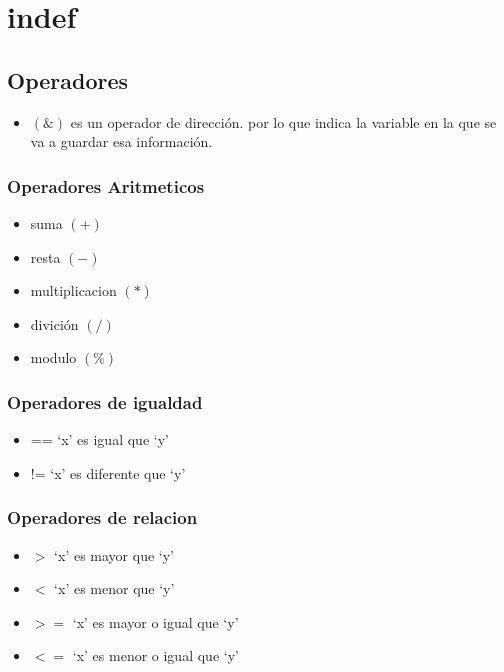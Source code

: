 \documentclass[]{article}
\begin{document}
	\section{indef}
	
	\subsection{Operadores}
	
	\begin{itemize}
		\item $\left(\&\right)$ es un operador de dirección. por lo que indica la variable en la que se va a guardar esa información.
	\end{itemize}
	
	\subsubsection{Operadores Aritmeticos}
	
	\begin{itemize}
		\item suma $\left(+\right)$
		\item resta $\left(-\right)$
		\item multiplicacion $\left(*\right)$
		\item divición $\left(/\right)$
		\item modulo $\left(\%\right)$
	\end{itemize}
	
	\subsubsection{Operadores de igualdad}
	
	\begin{itemize}
		\item ==	`x' es igual que `y'
		\item  !=	`x' es diferente que `y'
	\end{itemize}
	
	\subsubsection{Operadores de relacion}
	
	\begin{itemize}
		\item $>$	`x' es mayor que `y'
		\item $<$	`x' es menor que `y'
		\item $>=$	`x' es mayor o igual que `y'
		\item $<=$	`x' es menor o igual que `y'
	\end{itemize}
	
\end{document}
